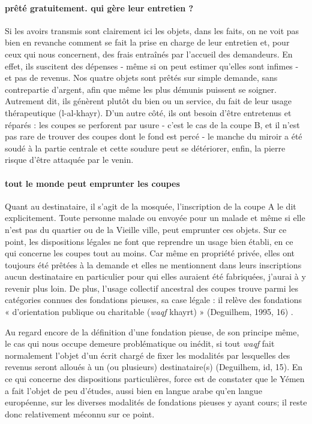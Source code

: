  \paragraph{prêté gratuitement. qui gère leur entretien ?}
Si les avoirs transmis sont clairement ici les objets, dans les faits, on ne voit pas bien en revanche comment se fait la prise en charge de leur entretien et, pour ceux qui nous concernent, des frais entraînés par l'accueil des demandeurs. En effet, ils suscitent des dépenses - même si on peut estimer qu'elles sont infimes - et pas de revenus. Nos quatre
objets sont prêtés sur simple demande, sans contrepartie d'argent, afin que même les plus démunis puissent se soigner. Autrement dit, ils génèrent plutôt du bien ou un service, du fait de leur usage thérapeutique (l-al-khayr). D'un autre côté, ils ont besoin d'être entretenus et réparés : les coupes se perforent par usure - c'est le cas de la coupe B, et il n'est pas rare de trouver des coupes dont le fond est percé - le manche du miroir a été soudé à la partie centrale et cette soudure peut se détériorer, enfin, la pierre risque d'être attaquée par le venin. 

\paragraph{tout le monde peut emprunter les coupes}Quant au destinataire, il s'agit de la mosquée, l'inscription de la coupe A le dit explicitement. Toute personne malade ou envoyée pour un malade et même si elle n'est pas du quartier ou de la Vieille ville, peut emprunter ces objets. Sur ce point, les dispositions légales ne font que reprendre un usage bien établi, en ce qui concerne les coupes tout au moins. Car même en propriété privée, elles ont toujours été prêtées à la demande et elles ne mentionnent dans leurs inscriptions aucun destinataire en particulier pour qui elles auraient été fabriquées, j'aurai à y revenir plus loin. De plus, l'usage collectif ancestral des coupes trouve parmi les catégories connues des fondations pieuses, sa case légale : il relève des fondations « d'orientation publique
ou charitable (\textit{waqf} khayrt) » (Deguilhem, 1995, 16) .

Au regard encore de la définition d'une fondation pieuse, de son principe même, le cas qui nous occupe demeure problématique ou inédit, si tout \textit{waqf} fait normalement l'objet d'un écrit chargé de fixer les modalités par lesquelles des revenus seront alloués à un (ou plusieurs) destinataire(s) (Deguilhem, id, 15). En ce qui concerne des dispositions particulières, force est de constater que le Yémen a fait l'objet de peu d'études, aussi bien en langue arabe qu'en langue européenne, sur les diverses modalités de fondations pieuses y ayant cours; il reste donc relativement méconnu sur ce point.
